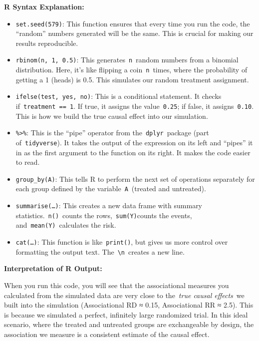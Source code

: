 \documentclass[
  10pt,
  letterpaper,
  DIV=11,
  numbers=noendperiod]{scrartcl}
\begin{document}
\textbf{R Syntax Explanation:}

\begin{itemize}
\item
  \texttt{set.seed(579)}: This function ensures that every time you run
  the code, the ``random'' numbers generated will be the same. This is
  crucial for making our results reproducible.
\item
  \texttt{rbinom(n,\ 1,\ 0.5)}: This generates~\texttt{n}~random numbers
  from a binomial distribution. Here, it's like flipping a
  coin~\texttt{n}~times, where the probability of getting a 1 (heads) is
  0.5. This simulates our random treatment assignment.
\item
  \texttt{ifelse(test,\ yes,\ no)}: This is a conditional statement. It
  checks if~\texttt{treatment\ ==\ 1}. If true, it assigns the
  value~\texttt{0.25}; if false, it assigns~\texttt{0.10}. This is how
  we build the true causal effect into our simulation.
\item
  \texttt{\%\textgreater{}\%}: This is the ``pipe'' operator from
  the~\texttt{dplyr}~package (part of~\texttt{tidyverse}). It takes the
  output of the expression on its left and ``pipes'' it in as the first
  argument to the function on its right. It makes the code easier to
  read.
\item
  \texttt{group\_by(A)}: This tells R to perform the next set of
  operations separately for each group defined by the
  variable~\texttt{A}~(treated and untreated).
\item
  \texttt{summarise(…)}: This creates a new data frame with summary
  statistics.~\texttt{n()}~counts the rows,~\texttt{sum(Y)}counts the
  events, and~\texttt{mean(Y)}~calculates the risk.
\item
  \texttt{cat(…)}: This function is like~\texttt{print()}, but gives us
  more control over formatting the output text.
  The~\texttt{\textbackslash{}n}~creates a new line.
\end{itemize}

\textbf{Interpretation of R Output:}

When you run this code, you will see that the associational measures you
calculated from the simulated data are very close to the~\emph{true
causal effects}~we built into the simulation (Associational RD ≈ 0.15,
Associational RR ≈ 2.5). This is because we simulated a perfect,
infinitely large randomized trial. In this ideal scenario, where the
treated and untreated groups are exchangeable by design, the association
we measure is a consistent estimate of the causal effect.
\end{document}
